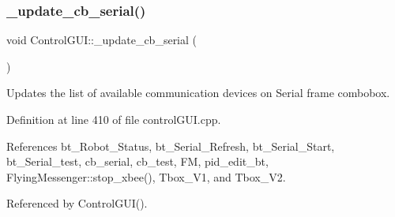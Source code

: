\subsubsection{\texorpdfstring{\+\_\+update\+\_\+cb\+\_\+serial()}{\_update\_cb\_serial()}}
{\footnotesize\ttfamily void Control\+G\+U\+I\+::\+\_\+update\+\_\+cb\+\_\+serial (\begin{DoxyParamCaption}{ }\end{DoxyParamCaption})}



Updates the list of available communication devices on \textquotesingle{}Serial\textquotesingle{} frame combobox. 



Definition at line 410 of file control\+G\+U\+I.\+cpp.



References bt\+\_\+\+Robot\+\_\+\+Status, bt\+\_\+\+Serial\+\_\+\+Refresh, bt\+\_\+\+Serial\+\_\+\+Start, bt\+\_\+\+Serial\+\_\+test, cb\+\_\+serial, cb\+\_\+test, FM, pid\+\_\+edit\+\_\+bt, Flying\+Messenger\+::stop\+\_\+xbee(), Tbox\+\_\+\+V1, and Tbox\+\_\+\+V2.



Referenced by Control\+G\+U\+I().


